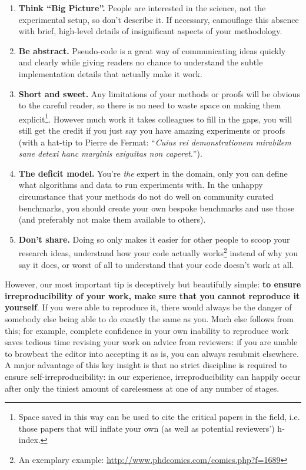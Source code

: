 \documentclass[a4paper,11pt]{article}
\begin{document}
\begin{enumerate}
\item {\textbf{Think ``Big Picture''.}} People are interested in the
science, not the experimental setup, so don't describe it. If
necessary, camouflage this absence with brief, high-level details of
insignificant aspects of your methodology.
\item {\textbf{Be abstract.}} Pseudo-code is a great way of
communicating ideas quickly and clearly while giving readers no chance
to understand the subtle implementation details that actually make it
work.
\item {\textbf{Short and sweet.}} Any limitations of your
methods or proofs will be obvious to the careful reader, so there is
no need to waste space on making them explicit\footnote{Space saved in
this way can be used to cite the critical papers in the field,
i.e. those papers that will inflate your own (as well as potential
reviewers') h-index.}. However much work it takes colleagues to fill
in the gaps, you will still get the credit if you just say you have
amazing experiments or proofs (with a hat-tip to Pierre de Fermat:
``{\emph{Cuius rei demonstrationem mirabilem sane detexi hanc marginis
exiguitas non caperet.}}'').
\item {\textbf{The deficit model.}} You're \emph{the} expert in the
domain, only you can define what algorithms and data to run
experiments with. In the unhappy circumstance that your methods do not
do well on community curated benchmarks, you should create your own
bespoke benchmarks and use those (and preferably not make them
available to others).
\item {\textbf{Don't share.}} Doing so only makes it easier for other
people to scoop your research ideas, understand how your code actually
works\footnote{An exemplary example:
\url{http://www.phdcomics.com/comics.php?f=1689}} instead of why you
say it does, or worst of all to understand that your code doesn't work
at all.
\end{enumerate}

However, our most important tip is deceptively but beautifully simple:
{\textbf{to ensure irreproducibility of your work, make sure that you cannot
reproduce it yourself}}. If you were able to reproduce it, there would
always be the danger of somebody else being able to do exactly the
same as you. Much else follows from this; for example, complete
confidence in your own inability to reproduce work saves tedious time
revising your work on advice from reviewers: if you are unable to
browbeat the editor into accepting it as is, you can always resubmit
elsewhere. A major advantage of this key insight is that no strict
discipline is required to ensure self-irreproducibility: in our
experience, irreproducibility can happily occur after only the tiniest
amount of carelessness at one of any number of stages.
\end{document}
